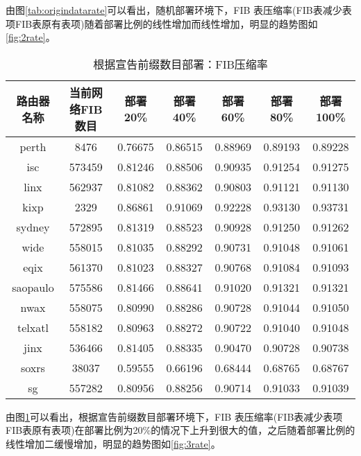 由图\ref{tab:origindatarate}可以看出，随机部署环境下，FIB 表压缩率(FIB表减少表项\/FIB表原有表项)随着部署比例的线性增加而线性增加，明显的趋势图如\ref{fig:2rate}。

\begin{table}[h]
    \centering
    \caption{根据宣告前缀数目部署：FIB压缩率}
    \label{tab:prefixorigindatarate}
        \begin{tabular}{|c|c|c|c|c|c|c|}
            \hline
            路由器名称 & 当前网络FIB数目 & 部署20\% &部署40\% &部署60\% &部署80\% &部署100\% \\ \hline
            perth    & 8476   & 0.76675   & 0.86515   & 0.88969   & 0.89193   & 0.89228      \\ \hline
            isc      & 573459 & 0.81246 & 0.88506  & 0.90935 & 0.91254 & 0.91275    \\ \hline
            linx     & 562937 & 0.81082 & 0.88362 & 0.90803  & 0.91121 & 0.91130     \\ \hline
            kixp     & 2329   & 0.86861    & 0.91069    & 0.92228   & 0.93130   & 0.93731        \\ \hline
            sydney   & 572895 & 0.81319 & 0.88523  & 0.90928 & 0.91250 & 0.91262       \\ \hline
            wide     & 558015 & 0.81035 & 0.88292  & 0.90731 & 0.91048 & 0.91061        \\ \hline
            eqix     & 561370 & 0.81023 & 0.88327  & 0.90768 & 0.91084 & 0.91093         \\ \hline
            saopaulo & 575586 & 0.81466 & 0.88641  & 0.91020 & 0.91321 & 0.91321          \\ \hline
            nwax     & 558075 & 0.80990 & 0.88286  & 0.90728 & 0.91044 & 0.91050           \\ \hline
            telxatl  & 558182 & 0.80963 & 0.88272  & 0.90722 & 0.91040 & 0.91048            \\ \hline
            jinx     & 536466 & 0.81405  & 0.88335  & 0.90470 & 0.90728 & 0.90738             \\ \hline
            soxrs    & 38037  & 0.59555  & 0.66196  & 0.68444 & 0.68765 & 0.68767              \\ \hline
            sg       & 557282 & 0.80956 & 0.88256  & 0.90714 & 0.91033 & 0.91039               \\ \hline
        \end{tabular}
\end{table}

由图\ref{tab:prefixorigindatarate}可以看出，根据宣告前缀数目部署环境下，FIB 表压缩率(FIB表减少表项\/FIB表原有表项)在部署比例为20\%的情况下上升到很大的值，之后随着部署比例的线性增加二缓慢增加，明显的趋势图如\ref{fig:3rate}。

